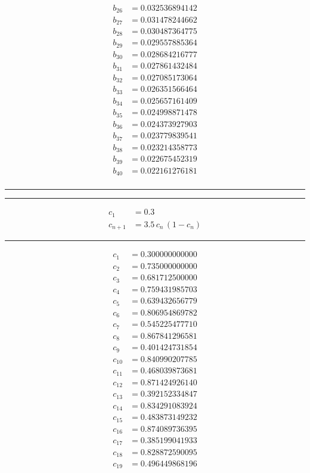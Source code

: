 \documentclass[10pt,letterpaper]{article}
\begin{document}
\begin{multicols}{4}
\begin{align*}
b_{26} &= 0.032536894142 \\
b_{27} &= 0.031478244662 \\
b_{28} &= 0.030487364775 \\
b_{29} &= 0.029557885364 \\
b_{30} &= 0.028684216777 \\
b_{31} &= 0.027861432484 \\
b_{32} &= 0.027085173064 \\
b_{33} &= 0.026351566464 \\
b_{34} &= 0.025657161409 \\
b_{35} &= 0.024998871478 \\
b_{36} &= 0.024373927903 \\
b_{37} &= 0.023779839541 \\
b_{38} &= 0.023214358773 \\
b_{39} &= 0.022675452319 \\
b_{40} &= 0.022161276181 \\
\end{align*}
\vfill
\columnbreak
\hrule
\hrule
\begin{align*}
c_1 &= 0.3 \\
c_{n+1} &= 3.5 \, c_n \, (1-c_n)
\end{align*}
\hrule
\begin{align*}
c_{1} &= 0.300000000000 \\
c_{2} &= 0.735000000000 \\
c_{3} &= 0.681712500000 \\
c_{4} &= 0.759431985703 \\
c_{5} &= 0.639432656779 \\
c_{6} &= 0.806954869782 \\
c_{7} &= 0.545225477710 \\
c_{8} &= 0.867841296581 \\
c_{9} &= 0.401424731854 \\
c_{10} &= 0.840990207785 \\
c_{11} &= 0.468039873681 \\
c_{12} &= 0.871424926140 \\
c_{13} &= 0.392152334847 \\
c_{14} &= 0.834291083924 \\
c_{15} &= 0.483873149232 \\
c_{16} &= 0.874089736395 \\
c_{17} &= 0.385199041933 \\
c_{18} &= 0.828872590095 \\
c_{19} &= 0.496449868196 \\

\end{align*}
\end{multicols}
\end{document}
